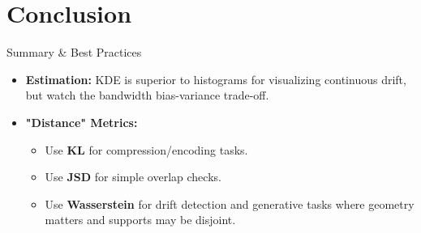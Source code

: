 \documentclass[10pt,aspectratio=169]{ntuabeamer}
\begin{document}
	\section{Conclusion}
	
	\begin{frame}{Summary \& Best Practices}
		\begin{itemize}
			\item \textbf{Estimation:} KDE is superior to histograms for visualizing continuous drift, but watch the bandwidth bias-variance trade-off.
			\item \textbf{"Distance" Metrics:} 
			\begin{itemize}
				\item Use \textbf{KL} for compression/encoding tasks.
				\item Use \textbf{JSD} for simple overlap checks.
				\item Use \textbf{Wasserstein} for drift detection and generative tasks where geometry matters and supports may be disjoint.
			\end{itemize}
		\end{itemize}
		
	\end{frame}
	
\end{document}
